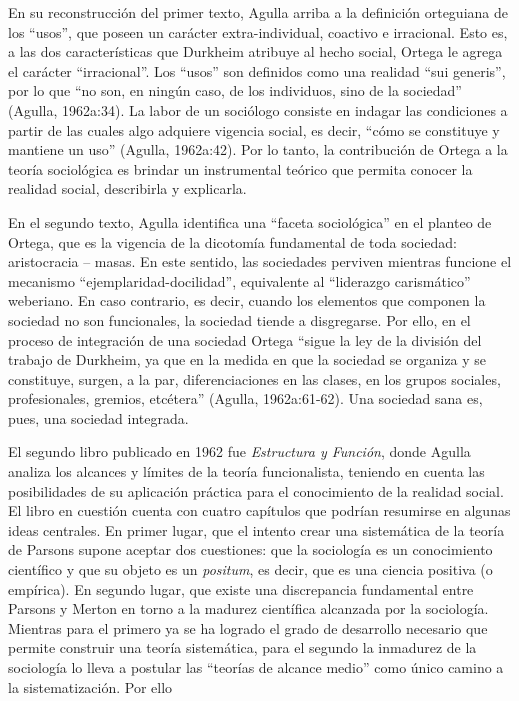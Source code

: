 En su reconstrucción del primer texto, Agulla arriba a la definición orteguiana de los ``usos'', que poseen un carácter extra-individual, coactivo e irracional. Esto es, a las dos características que Durkheim atribuye al hecho social, Ortega le agrega el carácter ``irracional''. Los ``usos'' son definidos como una realidad ``sui generis'', por lo que ``no son, en ningún caso, de los individuos, sino de la sociedad'' (Agulla, 1962a:34). La labor de un sociólogo consiste en indagar las condiciones a partir de las cuales algo adquiere vigencia social, es decir, ``cómo se constituye y mantiene un uso'' (Agulla, 1962a:42). Por lo tanto, la contribución de Ortega a la teoría sociológica es brindar un instrumental teórico que permita conocer la realidad social, describirla y explicarla.

En el segundo texto, Agulla identifica una ``faceta sociológica'' en el planteo de Ortega, que es la vigencia de la dicotomía fundamental de toda sociedad: aristocracia -- masas. En este sentido, las sociedades perviven mientras funcione el mecanismo ``ejemplaridad-docilidad'', equivalente al ``liderazgo carismático'' weberiano. En caso contrario, es decir, cuando los elementos que componen la sociedad no son funcionales, la sociedad tiende a disgregarse. Por ello, en el proceso de integración de una sociedad Ortega ``sigue la ley de la división del trabajo de Durkheim, ya que en la medida en que la sociedad se organiza y se constituye, surgen, a la par, diferenciaciones en las clases, en los grupos sociales, profesionales, gremios, etcétera'' (Agulla, 1962a:61-62). Una sociedad sana es, pues, una sociedad integrada.

El segundo libro publicado en 1962 fue \emph{Estructura y Función}, donde Agulla analiza los alcances y límites de la teoría funcionalista, teniendo en cuenta las posibilidades de su aplicación práctica para el conocimiento de la realidad social. El libro en cuestión cuenta con cuatro capítulos que podrían resumirse en algunas ideas centrales. En primer lugar, que el intento crear una sistemática de la teoría de Parsons supone aceptar dos cuestiones: que la sociología es un conocimiento científico y que su objeto es un \emph{positum}, es decir, que es una ciencia positiva (o empírica). En segundo lugar, que existe una discrepancia fundamental entre Parsons y Merton en torno a la madurez científica alcanzada por la sociología. Mientras para el primero ya se ha logrado el grado de desarrollo necesario que permite construir una teoría sistemática, para el segundo la inmadurez de la sociología lo lleva a postular las ``teorías de alcance medio'' como único camino a la sistematización. Por ello

